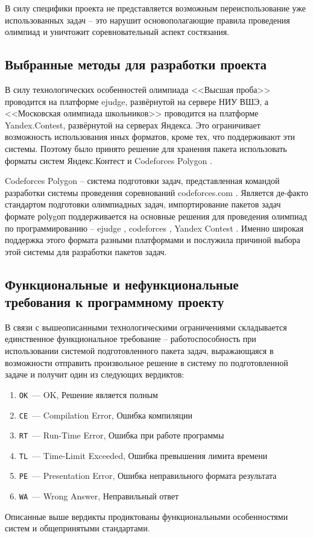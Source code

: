 \documentclass[a4paper]{article}
\begin{document}
В силу специфики проекта не представляется возможным переиспользование уже использованных задач -- это нарушит основополагающие правила проведения олимпиад и уничтожит соревновательный аспект состязания. 

\subsection{Выбранные методы для разработки проекта}


В силу технологических особенностей олимпиада <<Высшая проба>> проводится на платформе  ejudge, развёрнутой на сервере НИУ ВШЭ, а <<Московская олимпиада школьников>> проводится на платформе Yandex.Contest, развёрнутой на серверах Яндекса. Это ограничивает возможность использования иных форматов, кроме тех, что поддерживают эти системы. Поэтому было принято решение для хранения пакета использовать форматы систем Яндекс.Контест \cite{YaContest} и
Codeforces Polygon \cite{Polygon}.

Codeforces Polygon -- система подготовки задач, представленная командой разработки системы проведения соревнований codeforces.com \cite{Codeforces}. Является де-факто стандартом подготовки олимпиадных задач, импортирование пакетов задач формате роlуgоп поддерживается на основные решения для проведения олимпиад по программированию -- ejudge \cite{Ejudge}, codeforces \cite{Codeforces}, Yandex Contest \cite{YaContest}. Именно широкая поддержка этого формата разными платформами и послужила причиной выбора этой системы для разработки пакетов задач. 

\subsection{Функциональные и нефункциональные требования к программному проекту}

В связи с вышеописанными технологическими ограничениями складывается единственное функциональное требование -- работоспособность при использовании системой подготовленного пакета задач, выражающаяся в возможности отправить произвольное решение в систему по подготовленной задаче и получит один из следующих вердиктов:
\begin{enumerate}
\item    \texttt{OK}~--- OK, Решение является полным
\item    \texttt{CE}~--- Compilation Error, Ошибка компиляции
\item    \texttt{RT}~--- Run-Time Error, Ошибка при работе программы
\item    \texttt{TL}~--- Time-Limit Exceeded, Ошибка превышения лимита времени
\item    \texttt{PE}~--- Presentation Error, Ошибка неправильного формата результата
\item    \texttt{WA}~--- Wrong Answer, Неправильный ответ
\end{enumerate}
Описанные выше вердикты продиктованы функциональными особенностями систем и общепринятыми стандартами.
\end{document}
